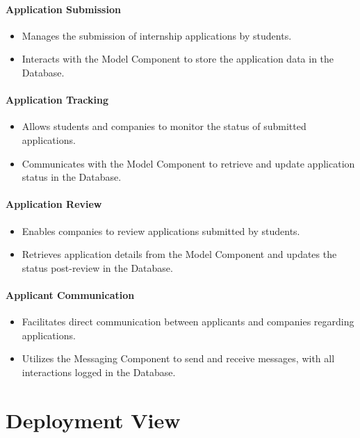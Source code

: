 \paragraph{Application Submission}
\begin{itemize}
    \item Manages the submission of internship applications by students.
    \item Interacts with the Model Component to store the application data in the Database.
\end{itemize}

\paragraph{Application Tracking}
\begin{itemize}
    \item Allows students and companies to monitor the status of submitted applications.
    \item Communicates with the Model Component to retrieve and update application status in the Database.
\end{itemize}

\paragraph{Application Review}
\begin{itemize}
    \item Enables companies to review applications submitted by students.
    \item Retrieves application details from the Model Component and updates the status post-review in the Database.
\end{itemize}

\paragraph{Applicant Communication}
\begin{itemize}
    \item Facilitates direct communication between applicants and companies regarding applications.
    \item Utilizes the Messaging Component to send and receive messages, with all interactions logged in the Database.
\end{itemize}

\section{Deployment View}
\label{sec:deployment_view}

